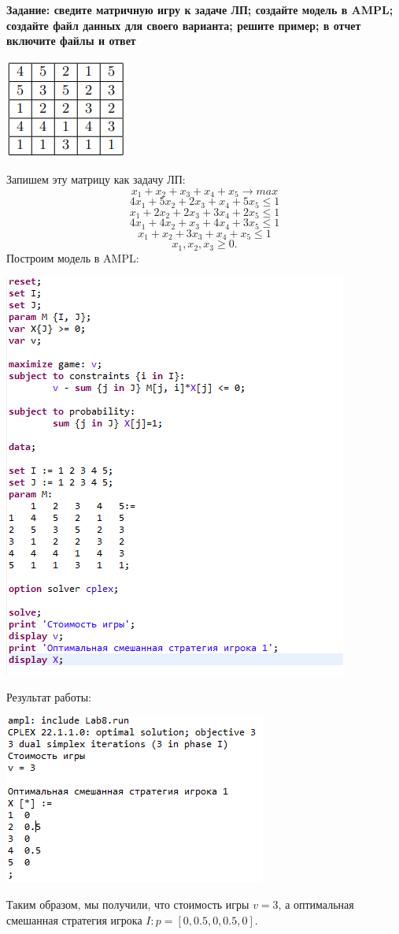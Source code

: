 \documentclass[11pt]{article}
\begin{document}
\textbf{Задание: сведите матричную игру к задаче ЛП; создайте модель в AMPL; создайте файл данных для своего варианта; решите пример; в отчет включите файлы
и ответ} 
\begin{center}
    \includegraphics[width=0.25\linewidth]{image_2.png}
\end{center}
Запишем эту матрицу как задачу ЛП:
$$x_1 + x_2 + x_3 + x_4 + x_5 \rightarrow max$$
$$4x_1 + 5x_2+2x_3+x_4+5x_5 \leq 1$$
$$x_1 + 2x_2+2x_3+3x_4+2x_5 \leq 1$$
$$4x_1 + 4x_2+x_3+4x_4+3x_5 \leq 1$$
$$x_1 + x_2+3x_3+x_4+x_5 \leq 1$$
$$x_1, x_2, x_3 \geq 0.$$
Построим модель в AMPL:
\begin{center}
    \includegraphics[width=0.75\linewidth]{image_3.png}
\end{center}
Результат работы:
\begin{center}
    \includegraphics[width=0.5\linewidth]{image_4.png}
\end{center}
Таким образом, мы получили, что стоимость игры $v = 3$, а оптимальная смешанная стратегия игрока $I: p = [0, 0.5, 0, 0.5, 0].$
\end{document}
